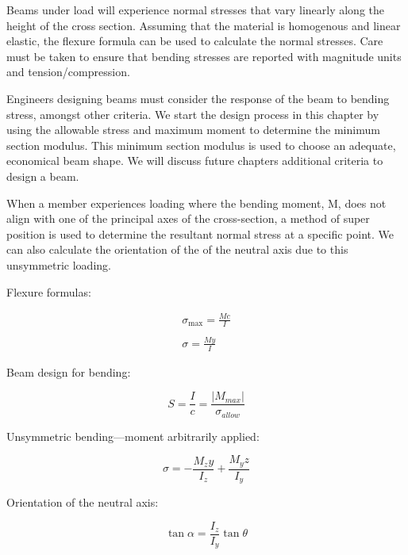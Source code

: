 \documentclass[
  letterpaper,
  DIV=11,
  numbers=noendperiod]{scrreprt}
\theoremstyle{definition}
\theoremstyle{remark}
\begin{document}
\begin{tcolorbox}[enhanced jigsaw, leftrule=.75mm, colbacktitle=quarto-callout-note-color!10!white, breakable, opacityback=0, colback=white, titlerule=0mm, toprule=.15mm, colframe=quarto-callout-note-color-frame, coltitle=black, title={Key takeaways}, toptitle=1mm, bottomrule=.15mm, rightrule=.15mm, left=2mm, arc=.35mm, opacitybacktitle=0.6, bottomtitle=1mm]

Beams under load will experience normal stresses that vary linearly
along the height of the cross section. Assuming that the material is
homogenous and linear elastic, the flexure formula can be used to
calculate the normal stresses. Care must be taken to ensure that bending
stresses are reported with magnitude units and tension/compression.

Engineers designing beams must consider the response of the beam to
bending stress, amongst other criteria. We start the design process in
this chapter by using the allowable stress and maximum moment to
determine the minimum section modulus. This minimum section modulus is
used to choose an adequate, economical beam shape. We will discuss
future chapters additional criteria to design a beam.

When a member experiences loading where the bending moment, M, does not
align with one of the principal axes of the cross-section, a method of
super position is used to determine the resultant normal stress at a
specific point. We can also calculate the orientation of the of the
neutral axis due to this unsymmetric loading.

\end{tcolorbox}

\begin{tcolorbox}[enhanced jigsaw, leftrule=.75mm, colbacktitle=quarto-callout-note-color!10!white, breakable, opacityback=0, colback=white, titlerule=0mm, toprule=.15mm, colframe=quarto-callout-note-color-frame, coltitle=black, title={Key equations}, toptitle=1mm, bottomrule=.15mm, rightrule=.15mm, left=2mm, arc=.35mm, opacitybacktitle=0.6, bottomtitle=1mm]

Flexure formulas:\,

\[
\begin{gathered}
\sigma_{\max }=\frac{M c}{I} \\
\\
\sigma=\frac{M y}{I}
\end{gathered}
\]

Beam design for bending:

\[
S=\frac{I}{c}=\frac{\left|M_{max}\right|}{\sigma_{allow}}
\]

Unsymmetric bending---moment arbitrarily applied:

\[
\sigma=-\frac{M_z y}{I_z}+\frac{M_y z}{I_y}
\]

Orientation of the neutral axis:

\[
\tan \alpha=\frac{I_z}{I_y} \tan \theta
\]

\end{tcolorbox}
\end{document}
